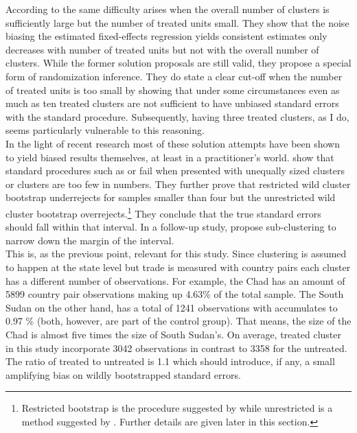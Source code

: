 \documentclass{article}
\begin{document}
According to \cite{conley2011inference} the same difficulty arises when the overall number of clusters is sufficiently large but the number of treated units small. They show that the noise biasing the estimated fixed-effects regression yields consistent estimates only decreases with number of treated units but not with the overall number of clusters. While the former solution proposals are still valid, they propose a special form of randomization inference. They do state a clear cut-off when the number of treated units is too small by showing that under some circumstances even as much as ten treated clusters are not sufficient to have unbiased standard errors with the standard procedure. Subsequently, having three treated clusters, as I do, seems particularly vulnerable to this reasoning. \\
In the light of recent research most of these solution attempts have been shown to yield biased results themselves, at least in a practitioner's world. \cite{mackinnon2017wild} show that standard procedures such as \cite{bertrand2004much} or \cite{cameron2008bootstrap} fail when presented with unequally sized clusters or clusters are too few in numbers. They further prove that restricted wild cluster bootstrap underrejects for samples smaller than four but the unrestricted wild cluster bootstrap overrejects.\footnote{Restricted bootstrap is the procedure suggested by \cite{cameron2008bootstrap} while unrestricted is a method suggested by \cite{mackinnon2017wild}. Further details are given later in this section.} They conclude that the true standard errors should fall within that interval. In a follow-up study, \cite{mackinnon2018wild} propose sub-clustering to narrow down the margin of the interval. \\
This is, as the previous point, relevant for this study. Since clustering is assumed to happen at the state level but trade is measured with country pairs each cluster has a different number of observations. For example, the Chad has an amount of 5899 country pair observations making up 4.63\% of the total sample. The South Sudan on the other hand, has a total of 1241 observations with accumulates to 0.97 \% (both, however, are part of the control group). That means, the size of the Chad is almost five times the size of South Sudan's. On average, treated cluster in this study incorporate 3042 observations in contrast to 3358 for the untreated. The ratio of treated to untreated is 1.1 which should introduce, if any, a small amplifying bias on wildly bootstrapped standard errors. \\
\end{document}
